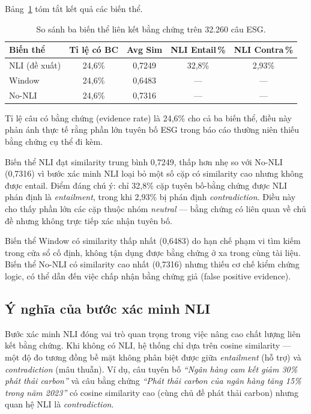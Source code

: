 Bảng~\ref{tab:evidence_variants} tóm tắt kết quả các biến thể.

\begin{table}[H]
\centering
\caption{So sánh ba biến thể liên kết bằng chứng trên 32.260 câu ESG.}
\label{tab:evidence_variants}
\begin{tabular}{lcccc}
\toprule
\textbf{Biến thể} & \textbf{Tỉ lệ có BC} & \textbf{Avg Sim} & \textbf{NLI Entail\,\%} & \textbf{NLI Contra\,\%} \\
\midrule
NLI (đề xuất)  & 24,6\% & 0,7249 & 32,8\% & 2,93\% \\
Window          & 24,6\% & 0,6483 & ---    & ---    \\
No-NLI          & 24,6\% & 0,7316 & ---    & ---    \\
\bottomrule
\end{tabular}
\end{table}

Tỉ lệ câu có bằng chứng (evidence rate) là 24,6\% cho cả ba biến thể, điều này phản ánh thực tế rằng phần lớn tuyên bố ESG trong báo cáo thường niên thiếu bằng chứng cụ thể đi kèm.

Biến thể NLI đạt similarity trung bình 0,7249, thấp hơn nhẹ so với No-NLI (0,7316) vì bước xác minh NLI loại bỏ một số cặp có similarity cao nhưng không được entail. Điểm đáng chú ý: chỉ 32,8\% cặp tuyên bố-bằng chứng được NLI phán định là \textit{entailment}, trong khi 2,93\% bị phán định \textit{contradiction}. Điều này cho thấy phần lớn các cặp thuộc nhóm \textit{neutral} --- bằng chứng có liên quan về chủ đề nhưng không trực tiếp xác nhận tuyên bố.

Biến thể Window có similarity thấp nhất (0,6483) do hạn chế phạm vi tìm kiếm trong cửa sổ cố định, không tận dụng được bằng chứng ở xa trong cùng tài liệu. Biến thể No-NLI có similarity cao nhất (0,7316) nhưng thiếu cơ chế kiểm chứng logic, có thể dẫn đến việc chấp nhận bằng chứng giả (false positive evidence).


\subsection{Ý nghĩa của bước xác minh NLI}
\label{subsec:nli_significance}

Bước xác minh NLI đóng vai trò quan trọng trong việc nâng cao chất lượng liên kết bằng chứng. Khi không có NLI, hệ thống chỉ dựa trên cosine similarity --- một độ đo tương đồng bề mặt không phân biệt được giữa \textit{entailment} (hỗ trợ) và \textit{contradiction} (mâu thuẫn). Ví dụ, câu tuyên bố \textit{``Ngân hàng cam kết giảm 30\% phát thải carbon''} và câu bằng chứng \textit{``Phát thải carbon của ngân hàng tăng 15\% trong năm 2023''} có cosine similarity cao (cùng chủ đề phát thải carbon) nhưng quan hệ NLI là \textit{contradiction}.

